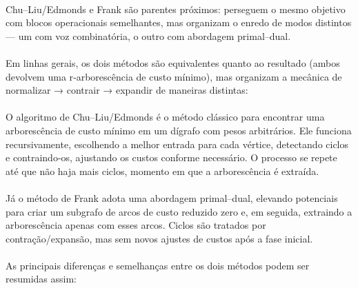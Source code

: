 \documentclass[12pt,a4paper]{article}
\begin{document}
\paragraph{}
Chu–Liu/Edmonds e Frank são parentes próximos: perseguem o mesmo objetivo com blocos operacionais semelhantes, mas organizam o enredo de modos distintos — um com voz combinatória, o outro com abordagem primal–dual.

\paragraph{}
Em linhas gerais, os dois métodos são equivalentes quanto ao resultado (ambos devolvem uma r‑arborescência de custo mínimo), mas organizam a mecânica de normalizar → contrair → expandir de maneiras distintas:

\paragraph{}
O algoritmo de Chu–Liu/Edmonds \cite{chu1965,edmonds1967} é o método clássico para encontrar uma arborescência de custo mínimo em um dígrafo com pesos arbitrários. Ele funciona recursivamente, escolhendo a melhor entrada para cada vértice, detectando ciclos e contraindo-os, ajustando os custos conforme necessário. O processo se repete até que não haja mais ciclos, momento em que a arborescência é extraída.

\paragraph{}
Já o método de Frank \cite{frank1981,frank2014} adota uma abordagem primal–dual, elevando potenciais para criar um subgrafo de arcos de custo reduzido zero e, em seguida, extraindo a arborescência apenas com esses arcos. Ciclos são tratados por contração/expansão, mas sem novos ajustes de custos após a fase inicial.

\paragraph{}
As principais diferenças e semelhanças entre os dois métodos podem ser resumidas assim:
\end{document}
